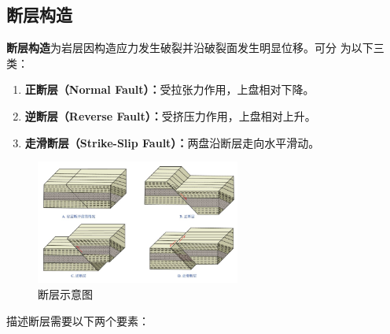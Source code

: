 \documentclass[a4paper,twoside]{ctexart}
\begin{document}
\subsection{断层构造}

\textbf{断层构造}为岩层因构造应力发生破裂并沿破裂面发生明显位移。可分
为以下三类：
\begin{enumerate}
\item \textbf{正断层（Normal Fault）：}受拉张力作用，上盘相对下降。
\item \textbf{逆断层（Reverse Fault）：}受挤压力作用，上盘相对上升。
\item \textbf{走滑断层（Strike-Slip Fault）：}两盘沿断层走向水平滑动。
\end{enumerate}
\begin{figure}[htbp]
  \centering
    \includegraphics[width=0.6\textwidth]{pic/断层示意图.png}
  \caption{断层示意图}
  \label{fig:断层示意图}
\end{figure}

描述断层需要以下两个要素：
\end{document}
